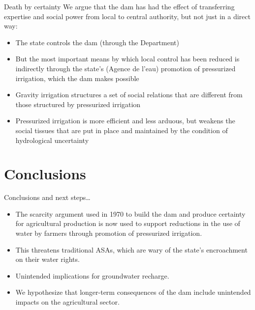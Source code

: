 \documentclass[newPxFont]{beamer}
\begin{document}

\begin{frame}[c]{Death by certainty}
We argue that the dam has had the effect of transferring expertise and social power from local to central authority, but not just in a direct way:

\begin{itemize}
	\item The state controls the dam (through the Department)
	\item But the most important means by which local control has been reduced is indirectly through the state’s (Agence de l’eau) promotion of pressurized irrigation, which the dam makes possible 
	\item Gravity irrigation structures a set of social relations that are different from those structured by pressurized irrigation
	\item Pressurized irrigation is more efficient and less arduous, but weakens the social tissues that are put in place and maintained by the condition of hydrological uncertainty
\end{itemize}
\end{frame}


\section{Conclusions}



\begin{frame}[c]{Conclusions and next steps…}
\begin{itemize}
	\item The scarcity argument used in 1970 to build the dam and produce certainty for agricultural production is now used to support reductions in the use of water by farmers through promotion of pressurized irrigation.
	\item This threatens traditional ASAs, which are wary of the state’s encroachment on their water rights.
	\item Unintended implications for groundwater recharge.
	\item We hypothesize that longer-term consequences of the dam include unintended impacts on the agricultural sector.
\end{itemize}
\end{frame}
\end{document}
